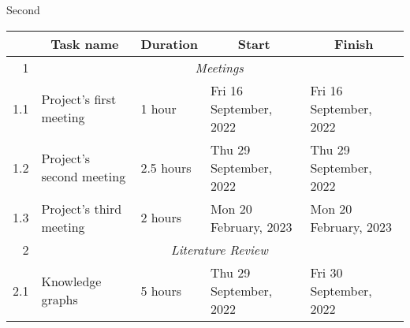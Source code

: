 Second\documentclass{standalone}
\begin{document}
\begin{tabular}{|r|llll|}
    \hline
    \rowcolor[HTML]{C0C0C0}
    \multicolumn{1}{|c|}{\cellcolor[HTML]{C0C0C0}\textbf{ID}}     & \multicolumn{1}{c|}{\cellcolor[HTML]{C0C0C0}\textbf{Task name}} & \multicolumn{1}{c|}{\cellcolor[HTML]{C0C0C0}\textbf{Duration}} & \multicolumn{1}{c|}{\cellcolor[HTML]{C0C0C0}\textbf{Start}} & \multicolumn{1}{c|}{\cellcolor[HTML]{C0C0C0}\textbf{Finish}} \\ \hline
    1                                                             & \multicolumn{4}{c|}{\textit{Meetings}}                                                                                                                                                                                                                        \\ \hline
    1.1                                                           & \multicolumn{1}{l|}{Project's first meeting}                    & \multicolumn{1}{l|}{1 hour}                                    & \multicolumn{1}{l|}{Fri 16 September, 2022}                 & Fri 16 September, 2022                                       \\ \hline
    1.2                                                           & \multicolumn{1}{l|}{Project's second meeting}                   & \multicolumn{1}{l|}{2.5 hours}                                 & \multicolumn{1}{l|}{Thu 29 September, 2022}                 & Thu 29 September, 2022                                       \\ \hline
    1.3                                                           & \multicolumn{1}{l|}{Project's third meeting}                    & \multicolumn{1}{l|}{2 hours}                                   & \multicolumn{1}{l|}{Mon 20 February, 2023}                  & Mon 20 February, 2023                                        \\ \hline
    2                                                             & \multicolumn{4}{c|}{\textit{Literature Review}}                                                                                                                                                                                                               \\ \hline
    2.1                                                           & \multicolumn{1}{l|}{Knowledge graphs}                           & \multicolumn{1}{l|}{5 hours}                                   & \multicolumn{1}{l|}{Thu 29 September, 2022}                 & Fri 30 September, 2022                                       \\ \hline

\end{tabular}
\end{document}
